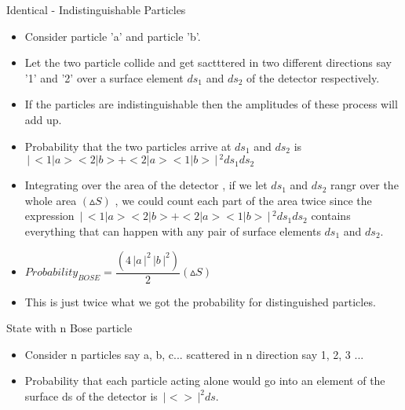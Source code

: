 \documentclass[aspectratio=169]{beamer}
\begin{document}
\begin{frame}{Identical - Indistinguishable Particles}

	\begin{itemize}
	
		\item Consider particle 'a' and particle 'b'. \newline
		\item Let the two particle collide and get sactttered in two different directions say '1' and '2' over a surface element $ds_{1}$ and $ds_{2}$ of the detector respectively. \newline
		\item If the particles are indistinguishable then the amplitudes of these process will add up. \newline
		\item Probability that the two particles arrive at $ds_{1}$ and $ds_{2}$ is \newline
		$\,\Bigr\rvert\,<1|a><2|b> + <2|a><1|b>\,\Bigr\rvert\,^{2} ds_{1} ds_{2}$
		
	\end{itemize}
	
\end{frame}

\begin{frame}

	\begin{itemize}
	
		\item Integrating over the area of the detector ,  if we let $ds_{1}$ and $ds_{2}$ rangr over the whole area $(\vartriangle S)$ , we could count each part of the area twice since the expression $\,\Bigr\rvert\,<1|a><2|b> + <2|a><1|b>\,\Bigr\rvert\,^{2} ds_{1} ds_{2}$ contains everything that can happen with any pair of surface elements $ds_{1}$ and $ds_{2}$. \newline
		\item $ Probability_{BOSE} = \dfrac{ \left(4\,\Bigr\rvert a \,\Bigr\rvert^{2} \,\Bigr\rvert b \,\Bigr\rvert^{2}\right)}{2} \left(\vartriangle S\right)$ \newline
		\item This is just twice what we got the probability for distinguished particles. 

	\end{itemize}
	
\end{frame}

\begin{frame}{State with n Bose particle}

	\begin{itemize}
	
		\item Consider n particles say a, b, c... scattered in n direction say 1, 2, 3 ... \newline
		\item Probability that each particle acting alone would go into an element of the surface ds of the detector is $\,\Bigr\rvert < >\,\Bigr\rvert^{2} ds$. 
		
	\end{itemize}
	
\end{frame} 
\end{document}
